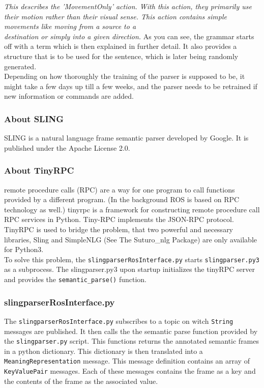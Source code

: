 \documentclass[main.tex]{subfiles}
\begin{document}
            \textit{This describes the 'MovementOnly' action.
                With this action, they primarily use their motion rather than their visual sense. This action contains simple movements like moving from a source to a\\ destination or simply into a given direction.}            
            As you can see, the grammar starts off with a term which is then explained in further detail. It also provides a structure that is to be used for the sentence, which is later being randomly generated.\\ 
            Depending on how thoroughly the training of the parser is supposed to be, it might take a few days up till a few weeks, and the parser needs to be retrained if new information or commands are added.
        
        \subsubsection{About SLING}
            SLING is a natural language frame semantic parser developed by Google. It is published under the Apache License 2.0.
        \subsubsection{About TinyRPC}
             remote procedure calls (RPC) are a way for one program to call functions provided by a different program. (In the background ROS is based on RPC technology as well.) tinyrpc is a framework for constructing remote procedure call RPC services in Python. Tiny-RPC implements the JSON-RPC protocol.\\
             TinyRPC is used to bridge the problem, that two powerful and necessary libraries, Sling and SimpleNLG (See The Suturo\_nlg Package) are only available for Python3.\\
             To solve this problem, the \texttt{slingparserRosInterface.py} starts \texttt{slingparser.py3} as a subprocess. The slingparser.py3 upon startup initializes the tinyRPC server and provides the \texttt{semantic\_parse()} function.
        \subsubsection[slingparserros]{slingparserRosInterface.py}
            The \texttt{slingparserRosInterface.py} subscribes to a topic on witch \texttt{String} messages are published. It then calls the the semantic parse function provided by the \texttt{slingparser.py} script. This functions returns the annotated semantic frames in a python dictionary. This dictionary is then translated into a \texttt{MeaningRepresentation} message. This message definition contains an array of \texttt{KeyValuePair} messages. Each of these messages contains the frame as a key and the contents of the frame as the associated value.
\end{document}
